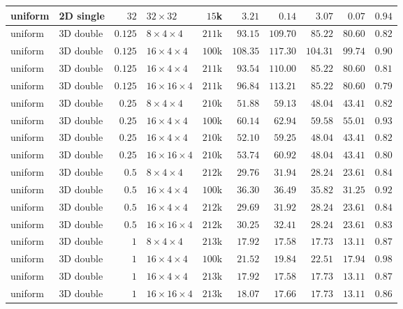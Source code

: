 {\begin{longtable}{llrlrrrrrr}
    uniform & 2D single & $32$ & $32{\times}32$ & $15$k & $3.21$ & $0.14$ & $3.07$ & $0.07$ & $0.94$ \\
    \midrule
    uniform & 3D double & $0.125$ & $8{\times}4{\times}4$ & $211$k & $93.15$ & $109.70$ & $85.22$ & $80.60$ & $0.82$ \\
    uniform & 3D double & $0.125$ & $16{\times}4{\times}4$ & $100$k & $108.35$ & $117.30$ & $104.31$ & $99.74$ & $0.90$ \\
    uniform & 3D double & $0.125$ & $16{\times}4{\times}4$ & $211$k & $93.54$ & $110.00$ & $85.22$ & $80.60$ & $0.81$ \\
    uniform & 3D double & $0.125$ & $16{\times}16{\times}4$ & $211$k & $96.84$ & $113.21$ & $85.22$ & $80.60$ & $0.79$ \\
    uniform & 3D double & $0.25$ & $8{\times}4{\times}4$ & $210$k & $51.88$ & $59.13$ & $48.04$ & $43.41$ & $0.82$ \\
    uniform & 3D double & $0.25$ & $16{\times}4{\times}4$ & $100$k & $60.14$ & $62.94$ & $59.58$ & $55.01$ & $0.93$ \\
    uniform & 3D double & $0.25$ & $16{\times}4{\times}4$ & $210$k & $52.10$ & $59.25$ & $48.04$ & $43.41$ & $0.82$ \\
    uniform & 3D double & $0.25$ & $16{\times}16{\times}4$ & $210$k & $53.74$ & $60.92$ & $48.04$ & $43.41$ & $0.80$ \\
    uniform & 3D double & $0.5$ & $8{\times}4{\times}4$ & $212$k & $29.76$ & $31.94$ & $28.24$ & $23.61$ & $0.84$ \\
    uniform & 3D double & $0.5$ & $16{\times}4{\times}4$ & $100$k & $36.30$ & $36.49$ & $35.82$ & $31.25$ & $0.92$ \\
    uniform & 3D double & $0.5$ & $16{\times}4{\times}4$ & $212$k & $29.69$ & $31.92$ & $28.24$ & $23.61$ & $0.84$ \\
    uniform & 3D double & $0.5$ & $16{\times}16{\times}4$ & $212$k & $30.25$ & $32.41$ & $28.24$ & $23.61$ & $0.83$ \\
    uniform & 3D double & $1$ & $8{\times}4{\times}4$ & $213$k & $17.92$ & $17.58$ & $17.73$ & $13.11$ & $0.87$ \\
    uniform & 3D double & $1$ & $16{\times}4{\times}4$ & $100$k & $21.52$ & $19.84$ & $22.51$ & $17.94$ & $0.98$ \\
    uniform & 3D double & $1$ & $16{\times}4{\times}4$ & $213$k & $17.92$ & $17.58$ & $17.73$ & $13.11$ & $0.87$ \\
    uniform & 3D double & $1$ & $16{\times}16{\times}4$ & $213$k & $18.07$ & $17.66$ & $17.73$ & $13.11$ & $0.86$ \\

\end{longtable}}

